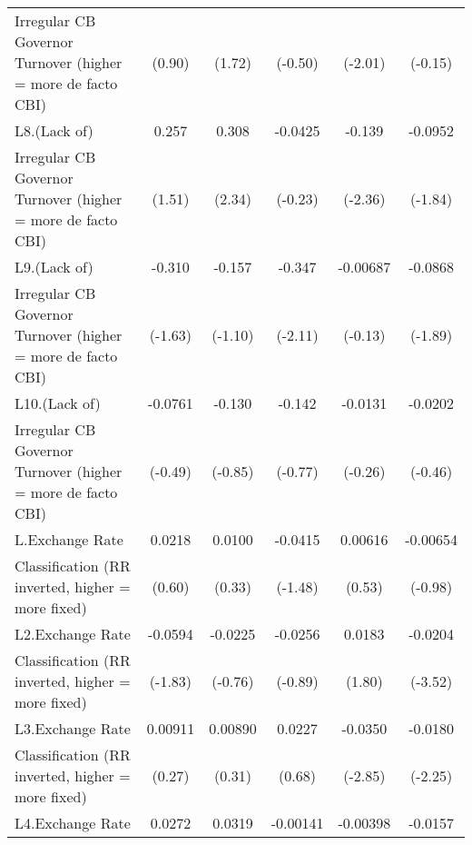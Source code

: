 {\begin{tabular}{l*{5}{c}}
Irregular CB Governor Turnover (higher = more de facto CBI)&      (0.90)         &      (1.72)         &     (-0.50)         &     (-2.01)         &     (-0.15)         \\
[1em]
L8.(Lack of)        &       0.257         &       0.308\sym{*}  &     -0.0425         &      -0.139\sym{*}  &     -0.0952         \\
Irregular CB Governor Turnover (higher = more de facto CBI)&      (1.51)         &      (2.34)         &     (-0.23)         &     (-2.36)         &     (-1.84)         \\
[1em]
L9.(Lack of)        &      -0.310         &      -0.157         &      -0.347\sym{*}  &    -0.00687         &     -0.0868         \\
Irregular CB Governor Turnover (higher = more de facto CBI)&     (-1.63)         &     (-1.10)         &     (-2.11)         &     (-0.13)         &     (-1.89)         \\
[1em]
L10.(Lack of)       &     -0.0761         &      -0.130         &      -0.142         &     -0.0131         &     -0.0202         \\
Irregular CB Governor Turnover (higher = more de facto CBI)&     (-0.49)         &     (-0.85)         &     (-0.77)         &     (-0.26)         &     (-0.46)         \\
[1em]
L.Exchange Rate     &      0.0218         &      0.0100         &     -0.0415         &     0.00616         &    -0.00654         \\
Classification (RR inverted, higher = more fixed)&      (0.60)         &      (0.33)         &     (-1.48)         &      (0.53)         &     (-0.98)         \\
[1em]
L2.Exchange Rate    &     -0.0594         &     -0.0225         &     -0.0256         &      0.0183         &     -0.0204\sym{***}\\
Classification (RR inverted, higher = more fixed)&     (-1.83)         &     (-0.76)         &     (-0.89)         &      (1.80)         &     (-3.52)         \\
[1em]
L3.Exchange Rate    &     0.00911         &     0.00890         &      0.0227         &     -0.0350\sym{**} &     -0.0180\sym{*}  \\
Classification (RR inverted, higher = more fixed)&      (0.27)         &      (0.31)         &      (0.68)         &     (-2.85)         &     (-2.25)         \\
[1em]
L4.Exchange Rate    &      0.0272         &      0.0319         &    -0.00141         &    -0.00398         &     -0.0157\sym{*}  \\

\end{tabular}}
